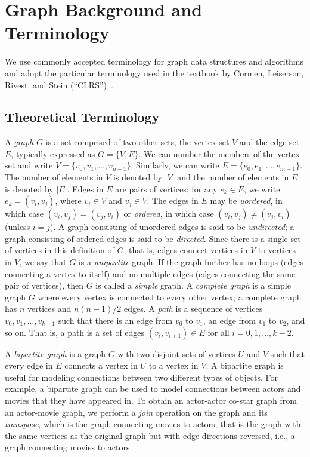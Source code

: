 \section{Graph Background and Terminology}

We use commonly accepted terminology for graph data structures and algorithms and 
adopt the particular terminology used in the textbook by
Cormen, Leiserson, Rivest, and Stein (``CLRS'')~\cite{CLRS2022}.

\subsection{Theoretical Terminology}

A \emph{graph} $G$ is a set comprised of two other sets, the vertex set $V$ and the edge set $E$, 
typically expressed as $G=\{V,E\}$.  We can number the members of the vertex set
and write $V = \{ v_0, v_1, \ldots , v_{n-1} \}$.  Similarly, we can write $E = \{ e_0, e_1, \ldots, e_{m-1} \}$.  The number of elements in $V$ is denoted by $|V|$ and the number of elements in $E$ is denoted by $|E|$.  Edges in $E$ are pairs of vertices; for any $e_k \in E$, we write $e_k = ( v_i, v_j )$, where $v_i \in V$ and $v_j\in V$.  The edges in $E$ may be \emph{uordered}, in which case $(v_i, v_j) = (v_j, v_i)$ or \emph{ordered}, in which case $(v_i, v_j) \neq (v_j, v_i)$ (unless $i = j$).
A graph consisting of unordered edges is said to be \emph{undirected}; 
a graph consisting of ordered edges is said to be \emph{directed}.
Since there is a single set of vertices in this definition of $G$, that is, edges connect
vertices in $V$ to vertices in $V$, we say that
$G$ is a \emph{unipartite} graph.
If the graph further has no loops (edges connecting a vertex to itself)
and no multiple edges (edges connecting the same pair of vertices),
then $G$ is called a \emph{simple} graph.
A \emph{complete graph} is a simple graph $G$ where every vertex is connected
to every other vertex; a complete graph has
$n$ vertices and $n(n-1)/2$ edges.
A \emph{path} is a sequence of vertices $v_0, v_1, \ldots, v_{k-1}$ such that
there is an edge from $v_0$ to $v_1$, an edge from $v_1$ to $v_2$, and so on.
That is, a path is a set of edges $(v_i, v_{i+1}) \in E$ for all $i = 0, 1, \ldots, k-2$.

A \emph{bipartite graph} is a graph $G$ with two disjoint sets of
vertices $U$ and $V$ such that every edge in $E$ connects a vertex
in $U$ to a vertex in $V$.  A bipartite graph is useful for modeling
connections between two different types of objects.  For example,
a bipartite graph can be used to model connections between
actors and movies that they have appeared in.  To obtain
an actor-actor co-star graph from an actor-movie graph, we
perform a \emph{join} operation on the graph and its \emph{transpose}, which is
the graph connecting movies to actors, that is the graph with the same
vertices as the original graph but with edge directions reversed, i.e., a graph
connecting movies to actors.

